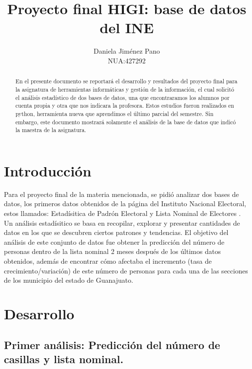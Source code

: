 \documentclass{article}
\title{Proyecto final HIGI: base de datos del INE}
\author{Daniela Jiménez Pano\\ NUA:427292}
\begin{document}
\maketitle

\begin{abstract}
    
En el presente documento se reportará el desarrollo y resultados del proyecto final para la asignatura de herramientas informáticas y gestión de la información, el cual solicitó el análisis estadístico de dos bases de datos, una que encontraramos los alumnos por cuenta propia y otra que nos indicara la profesora. Estos  estudios fueron realizados en python, herramienta nueva que aprendimos el último parcial del semestre. Sin embargo, este documento mostrará solamente el análisis de la base de datos que indicó la maestra de la asignatura.
\end{abstract}

\section{Introducción}

Para el proyecto final de la materia mencionada, se pidió analizar dos bases de datos, los primeros datos obtenidos de la página del Instituto Nacional Electoral, estos llamados: Estadísitica de Padrón Electoral y Lista Nominal de Electores \cite{DatosINE:Online}.
Un análisis estadísitico se basa en recopilar, explorar y presentar cantidades de datos en los que se descubren ciertos patrones y tendencias. \cite{ASH:2021:Online}
 El objetivo del análisis de este conjunto de datos fue obtener la predicción del número de personas dentro de la lista nominal 2 meses después de los últimos datos obtenidos, además de encontrar cómo afectaba el incremento (tasa de crecimiento/variación) de este número de personas para cada una de las secciones de los municipio del estado de Guanajuato. 
\section{Desarrollo}

\subsection{Primer análisis: Predicción del número de casillas y lista nominal.}
\end{document}
